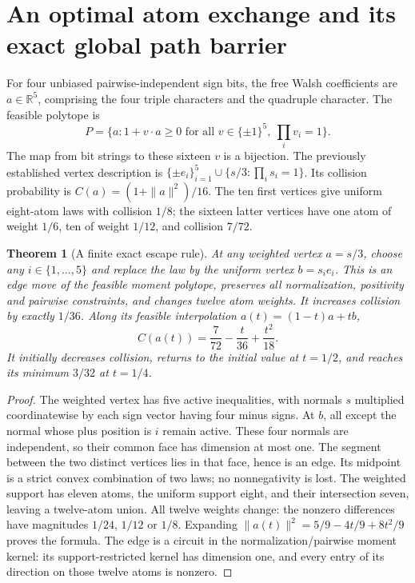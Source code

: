 \documentclass[11pt]{article}
\newtheorem{theorem}{Theorem}[section]
\begin{document}
\section{An optimal atom exchange and its exact global path barrier}

For four unbiased pairwise-independent sign bits, the free Walsh
coefficients are $a\in\mathbb R^5$, comprising the four triple
characters and the quadruple character. The feasible polytope is
\[
 P=\{a:1+v\cdot a\ge0\text{ for all }v\in\{\pm1\}^5,
 \ \prod_i v_i=1\}.
\]
The map from bit strings to these sixteen $v$ is a bijection.
The previously established vertex description is
$\{\pm e_i\}_{i=1}^5\cup\{s/3:\prod_i s_i=1\}$.
Its collision probability is $C(a)=(1+\|a\|^2)/16$.
The ten first vertices give uniform eight-atom laws with collision
$1/8$; the sixteen latter vertices have one atom of weight $1/6$,
ten of weight $1/12$, and collision $7/72$.

\begin{theorem}[A finite exact escape rule]
At any weighted vertex $a=s/3$, choose any $i\in\{1,\ldots,5\}$
and replace the law by the uniform vertex $b=s_i e_i$.
This is an edge move of the feasible moment polytope, preserves all
normalization, positivity and pairwise constraints, and changes
twelve atom weights. It increases collision by exactly $1/36$.
Along its feasible interpolation $a(t)=(1-t)a+tb$,
\[
 C(a(t))=\frac7{72}-\frac{t}{36}+\frac{t^2}{18}.
\]
It initially decreases collision, returns to the initial value at
$t=1/2$, and reaches its minimum $3/32$ at $t=1/4$.
\end{theorem}
\begin{proof}
The weighted vertex has five active inequalities, with normals
$s$ multiplied coordinatewise by each sign vector having four minus
signs. At $b$, all except the normal whose plus position is $i$
remain active. These four normals are independent, so their common
face has dimension at most one. The segment between the two distinct
vertices lies in that face, hence is an edge. Its midpoint is a
strict convex combination of two laws; no nonnegativity is lost.
The weighted support has eleven atoms, the uniform support eight,
and their intersection seven, leaving a twelve-atom union.
All twelve weights change: the nonzero differences have magnitudes
$1/24$, $1/12$ or $1/8$. Expanding
$\|a(t)\|^2=5/9-4t/9+8t^2/9$ proves the formula.
The edge is a circuit in the normalization/pairwise moment kernel:
its support-restricted kernel has dimension one, and every entry of
its direction on those twelve atoms is nonzero.
\end{proof}
\end{document}
